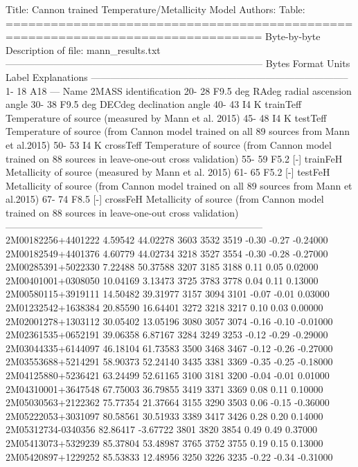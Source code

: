 Title: Cannon trained Temperature/Metallicity Model
Authors: 
Table: 
================================================================================
Byte-by-byte Description of file: mann_results.txt
--------------------------------------------------------------------------------
   Bytes Format Units Label      Explanations
--------------------------------------------------------------------------------
   1- 18 A18    ---     Name       2MASS identification
  20- 28 F9.5   deg     RAdeg      radial ascension angle
  30- 38 F9.5   deg     DECdeg     declination angle
  40- 43 I4     K       trainTeff  Temperature of source (measured by Mann et al. 2015)
  45- 48 I4     K       testTeff   Temperature of source (from Cannon model trained on all 89 sources from Mann et al.2015)
  50- 53 I4     K       crossTeff  Temperature of source (from Cannon model trained on 88 sources in leave-one-out cross validation)
  55- 59 F5.2   [-]     trainFeH   Metallicity of source (measured by Mann et al. 2015)
  61- 65 F5.2   [-]     testFeH    Metallicity of source (from Cannon model trained on all 89 sources from Mann et al.2015)
  67- 74 F8.5   [-]     crossFeH   Metallicity of source (from Cannon model trained on 88 sources in leave-one-out cross validation)
--------------------------------------------------------------------------------
2M00182256+4401222   4.59542  44.02278 3603 3532 3519 -0.30 -0.27 -0.24000 
2M00182549+4401376   4.60779  44.02734 3218 3527 3554 -0.30 -0.28 -0.27000 
2M00285391+5022330   7.22488  50.37588 3207 3185 3188  0.11  0.05  0.02000 
2M00401001+0308050  10.04169   3.13473 3725 3783 3778  0.04  0.11  0.13000 
2M00580115+3919111  14.50482  39.31977 3157 3094 3101 -0.07 -0.01  0.03000 
2M01232542+1638384  20.85590  16.64401 3272 3218 3217  0.10  0.03  0.00000 
2M02001278+1303112  30.05402  13.05196 3080 3057 3074 -0.16 -0.10 -0.01000 
2M02361535+0652191  39.06358   6.87167 3284 3249 3253 -0.12 -0.29 -0.29000 
2M03044335+6144097  46.18104  61.73583 3500 3468 3467 -0.12 -0.26 -0.27000 
2M03553688+5214291  58.90373  52.24140 3435 3381 3369 -0.35 -0.25 -0.18000 
2M04125880+5236421  63.24499  52.61165 3100 3181 3200 -0.04 -0.01  0.01000 
2M04310001+3647548  67.75003  36.79855 3419 3371 3369  0.08  0.11  0.10000 
2M05030563+2122362  75.77354  21.37664 3155 3290 3503  0.06 -0.15 -0.36000 
2M05222053+3031097  80.58561  30.51933 3389 3417 3426  0.28  0.20  0.14000 
2M05312734-0340356  82.86417  -3.67722 3801 3820 3854  0.49  0.49  0.37000 
2M05413073+5329239  85.37804  53.48987 3765 3752 3755  0.19  0.15  0.13000 
2M05420897+1229252  85.53833  12.48956 3250 3226 3235 -0.22 -0.34 -0.31000 
